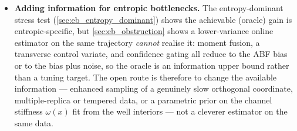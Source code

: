 \begin{itemize}
  \item \textbf{Adding information for entropic bottlenecks.} The
        entropy-dominant stress test (\cref{sec:eb_entropy_dominant}) shows the
        achievable (oracle) gain is entropic-specific, but
        \cref{sec:eb_obstruction} shows a lower-variance online estimator on the
        same trajectory \emph{cannot} realise it: moment fusion, a transverse
        control variate, and confidence gating all reduce to the ABF bias or to
        the bias plus noise, so the oracle is an information upper bound rather
        than a tuning target. The open route is therefore to change the available
        information --- enhanced sampling of a genuinely slow orthogonal
        coordinate, multiple-replica or tempered data, or a parametric prior on
        the channel stiffness $\omega(x)$ fit from the well interiors --- not a
        cleverer estimator on the same data.
\end{itemize}
